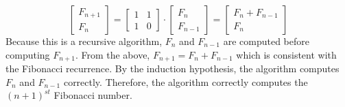 \documentclass[twoside,11pt]{homework}
\begin{document}
\begin{enumerate}[\bf (a)]
\begin{enumerate}[i.)]
 $$\begin{bmatrix}  F_{n+1}   \\  F_{n} \end{bmatrix} = \begin{bmatrix}  1 & 1  \\  1 & 0  \end{bmatrix} \cdot \begin{bmatrix}  F_{n}   \\  F_{n-1} \end{bmatrix} = \begin{bmatrix} F_n + F_{n-1} \\ F_n \end{bmatrix}$$
Because this is a recursive algorithm,  $F_n$ and $F_{n-1}$ are computed before computing $F_{n+1}$.  From the above, $F_{n+1} = F_n + F_{n-1}$ which is consistent with the Fibonacci recurrence.  By the induction hypothesis,  the algorithm computes $F_n$ and $F_{n-1}$ correctly. Therefore, the algorithm correctly computes the $(n+1)^{st}$ Fibonacci number.

\end{enumerate}
\end{enumerate}
\end{document}
